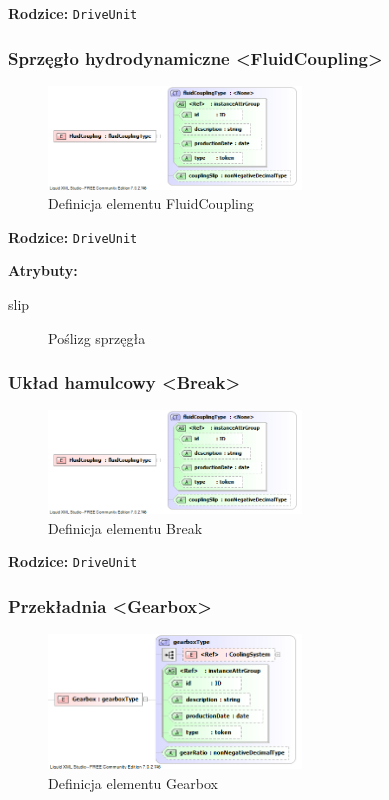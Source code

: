 \documentclass[12pt,a4paper]{article}
\begin{document}
\noindent\textbf{Rodzice:} \texttt{DriveUnit}

\subsubsection{Sprzęgło hydrodynamiczne <FluidCoupling>}

\begin{figure}[H]
  \centering
  \includegraphics[width=0.6\textwidth]{png/liquid/FluidCoupling}
  \caption{Definicja elementu FluidCoupling}
  \label{fig:fluidCoupling-xsd}
\end{figure}

\noindent\textbf{Rodzice:} \texttt{DriveUnit}

\noindent\textbf{Atrybuty:}
\begin{description}
\item[slip] Poślizg sprzęgła
\end{description}


\subsubsection{Układ hamulcowy <Break>}

\begin{figure}[H]
  \centering
  \includegraphics[width=0.6\textwidth]{png/liquid/FluidCoupling}
  \caption{Definicja elementu Break}
  \label{fig:break-xsd}
\end{figure}

\noindent\textbf{Rodzice:} \texttt{DriveUnit}

\subsubsection{Przekładnia <Gearbox>}

\begin{figure}[H]
  \centering
  \includegraphics[width=0.6\textwidth]{png/liquid/Gearbox}
  \caption{Definicja elementu Gearbox}
  \label{fig:gearbox-xsd}
\end{figure}
\end{document}
